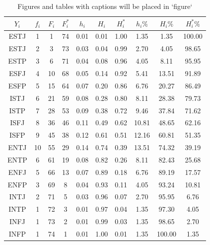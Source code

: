 \documentclass[10pt,]{krantz}
\theoremstyle{definition}
\theoremstyle{definition}
\theoremstyle{definition}
\theoremstyle{definition}
\theoremstyle{remark}
\begin{document}
\begin{longtable}[t]{cccccccccc}
\caption{\label{tab:2w3}Figures and tables with captions will be placed in `figure` }\\
\toprule
$Y_i$ & $f_i$ & $F_i$ & $F_i^*$ & $h_i$ & $H_i$ & $H_i^*$ & $h_i\%$ & $H_i\%$ & $H_i^*\%$\\
\midrule
ESTJ & 1 & 1 & 74 & 0.01 & 0.01 & 1.00 & 1.35 & 1.35 & 100.00\\
ESTJ & 2 & 3 & 73 & 0.03 & 0.04 & 0.99 & 2.70 & 4.05 & 98.65\\
ESTP & 3 & 6 & 71 & 0.04 & 0.08 & 0.96 & 4.05 & 8.11 & 95.95\\
ESFJ & 4 & 10 & 68 & 0.05 & 0.14 & 0.92 & 5.41 & 13.51 & 91.89\\
ESFP & 5 & 15 & 64 & 0.07 & 0.20 & 0.86 & 6.76 & 20.27 & 86.49\\
ISTJ & 6 & 21 & 59 & 0.08 & 0.28 & 0.80 & 8.11 & 28.38 & 79.73\\
ISTP & 7 & 28 & 53 & 0.09 & 0.38 & 0.72 & 9.46 & 37.84 & 71.62\\
ISFJ & 8 & 36 & 46 & 0.11 & 0.49 & 0.62 & 10.81 & 48.65 & 62.16\\
ISFP & 9 & 45 & 38 & 0.12 & 0.61 & 0.51 & 12.16 & 60.81 & 51.35\\
ENTJ & 10 & 55 & 29 & 0.14 & 0.74 & 0.39 & 13.51 & 74.32 & 39.19\\
ENTP & 6 & 61 & 19 & 0.08 & 0.82 & 0.26 & 8.11 & 82.43 & 25.68\\
ENFJ & 5 & 66 & 13 & 0.07 & 0.89 & 0.18 & 6.76 & 89.19 & 17.57\\
ENFP & 3 & 69 & 8 & 0.04 & 0.93 & 0.11 & 4.05 & 93.24 & 10.81\\
INTJ & 2 & 71 & 5 & 0.03 & 0.96 & 0.07 & 2.70 & 95.95 & 6.76\\
INTP & 1 & 72 & 3 & 0.01 & 0.97 & 0.04 & 1.35 & 97.30 & 4.05\\
INFJ & 1 & 73 & 2 & 0.01 & 0.99 & 0.03 & 1.35 & 98.65 & 2.70\\
INFP & 1 & 74 & 1 & 0.01 & 1.00 & 0.01 & 1.35 & 100.00 & 1.35\\
\bottomrule
\end{longtable}
\end{document}
